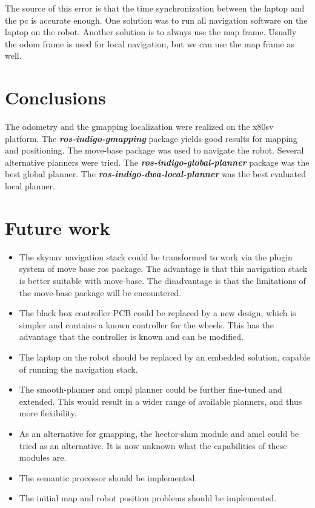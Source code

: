\documentclass[a4paper]{article}
\newcommand{\rospackage}[1]{\textbf{\textit{ros-indigo-#1}}}
\begin{document}
The source of this error is that the time synchronization between the laptop and the pc is accurate enough.
One solution was to run all navigation software on the laptop on the robot.
Another solution is to always use the map frame. Usually the odom frame is used for local navigation,
but we can
use the map frame as well.

\section{Conclusions}
The odometry and the gmapping localization were realized on the x80sv platform.
The \rospackage{gmapping} package yields good results for mapping and positioning.
The move-base package was used to navigate the robot. Several alternative planners were
tried. The \rospackage{global-planner} package was the best global planner. The \rospackage{dwa-local-planner}
was the best evaluated local planner.


\section{Future work}

\begin{itemize}
  \item The skynav navigation stack could be transformed to work via the plugin system of
    move base ros package. The advantage is that this navigation stack is better suitable
    with move-base. The disadvantage is that the limitations of the move-base package will
    be encountered.
  \item The black box controller PCB could be replaced by a new design, which is simpler
    and contains a known controller for the wheels. This has the advantage that the
    controller is known and can be modified.
  \item The laptop on the robot should be replaced by an embedded solution, capable of
    running the navigation stack.
  \item The smooth-planner and ompl planner could be further fine-tuned and extended.
    This would result in a wider range of available planners, and thus more flexibility.
  \item As an alternative for gmapping, the hector-slam module and amcl \cite{amcl}
    could be tried as an alternative. It is now unknown what the capabilities of these
    modules are.
  \item The semantic processor should be implemented.
  \item The initial map and robot position problems should be implemented.
\end{itemize}
\end{document}
